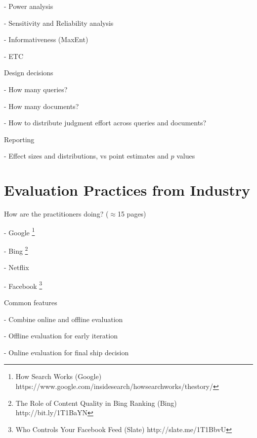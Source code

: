 \documentclass[openany]{now} %
\newcommand{\newpar}{\bigskip\noindent}
\begin{document}
- Power analysis \cite{Sakai:2014}

- Sensitivity and Reliability analysis \cite{Urbano:2013} 

- Informativeness (MaxEnt) \cite{AslamYP05}

- ETC \cite{Bron:2013} \cite{Boytsov:2013}  \cite{Robertson:2012}


\newpar
Design decisions

- How many queries? \cite{Sakai:2014}

- How many documents? \cite{CarterettePFK09}

- How to distribute judgment effort across queries and documents? \cite{CarterettePKAA09, YilmazR09}

\newpar
Reporting

- Effect sizes and distributions, vs point estimates and $p$ values

\chapter{Evaluation Practices from Industry}

How are the practitioners doing? (\ensuremath{\approx}15 pages)

-	Google \footnote{How Search Works (Google) https://www.google.com/insidesearch/howsearchworks/thestory/}

-	Bing \footnote{The Role of Content Quality in Bing Ranking (Bing)
	 http://bit.ly/1T1BaYN}

-	Netflix \cite{Gomez-Uribe2015}

-	Facebook \footnote{Who Controls Your Facebook Feed (Slate) http://slate.me/1T1BbvU}

\newpar
Common features

- Combine online and offline evaluation

- Offline evaluation for early iteration

- Online evaluation for final ship decision


\backmatter  %



	
\end{document}
